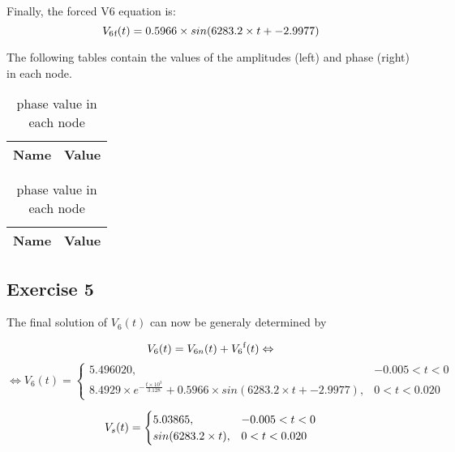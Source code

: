 Finally, the forced V6 equation is:
\begin{equation}
V_6\textsubscript{f}(t) = 0.5966\times sin(6283.2\times t + -2.9977)
\end{equation}

The following tables contain the values of the amplitudes (left) and phase (right) in each node.

\begin{table}[h]
    \parbox{.45\linewidth}{
    \centering
    \begin{tabular}{|l|r|}
    \hline
    {\bf Name} & {\bf Value } \\ \hline
    
    \end{tabular}
    \caption{amplitude value in each node}
    \label{tab:amplitude}
    }
    \hfill
    \parbox{.45\linewidth}{
    \centering
    \begin{tabular}{|l|r|}
        \hline
        {\bf Name} & {\bf Value } \\ \hline
        
    \end{tabular}
    \caption{phase value in each node}
    \label{tab:fase}
    }
\end{table}

\newpage
\subsection{Exercise 5}

The final solution of $V_6 (t)$ can now be generaly determined by


\begin{equation}
    \centering
    V_6 (t) = V_{6n} (t) + V_6\textsuperscript{f}(t) \Leftrightarrow
\end{equation}
\begin{equation}
    \Leftrightarrow V_6 (t) = \begin{cases} 5.496020, & -0.005 < t < 0 \\ 8.4929 \times e^{-\frac{t\times 10^3}{3.128}} + 0.5966\times sin(6283.2\times t + -2.9977), & 0 < t < 0.020 \end{cases}
\end{equation}

\begin{equation}
    \centering
    V_s (t) = \begin{cases} 5.03865, & -0.005 < t < 0 \\ sin(6283.2\times t), & 0 < t < 0.020 \end{cases}
\end{equation}

